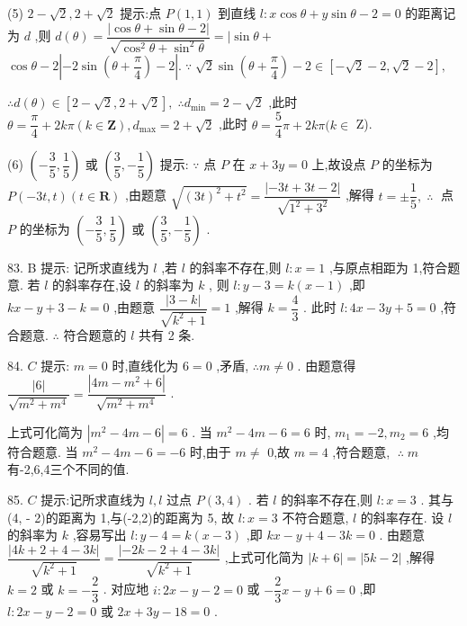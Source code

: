 (5) $2 - \sqrt{2},2 + \sqrt{2}$ 提示:点 $P\left( {1,1}\right)$ 到直线 $l : x\cos \theta  + y\sin \theta  - 2 = 0$ 的距离记为 $d$ ,则 $d\left( \theta \right)  = \dfrac{\left| \cos \theta  + \sin \theta  - 2\right| }{\sqrt{{\cos }^{2}\theta  + {\sin }^{2}\theta }} =  \mid  \sin \theta  +$  $\cos \theta  - 2\left| {-2\sin \left( {\theta  + \dfrac{\pi }{4}}\right)  - 2}\right| .\;\because \;\sqrt{2}\sin \left( {\theta  + \dfrac{\pi }{4}}\right)  - 2 \in  \left\lbrack  {-\sqrt{2} - 2,\sqrt{2} - 2}\right\rbrack  ,$

$\therefore d\left( \theta \right)  \in  \left\lbrack  {2 - \sqrt{2},2 + \sqrt{2}}\right\rbrack  ,\;\therefore {d}_{\min } = 2 - \sqrt{2}$ ,此时 $\theta  = \dfrac{\pi }{4} + {2k\pi }\left( {k \in  \mathbf{Z}}\right) ,{d}_{\max } = 2 + \sqrt{2}$ ,此时 $\theta  = \dfrac{5}{4}\pi  + {2k\pi }(k \in$ Z).

(6) $\left( {-\dfrac{3}{5},\dfrac{1}{5}}\right)$ 或 $\left( {\dfrac{3}{5}, - \dfrac{1}{5}}\right)$ 提示: $\because$ 点 $P$ 在 $x + {3y} = 0$ 上,故设点 $P$ 的坐标为 $P\left( {-{3t},t}\right) \left( {t \in  \mathbf{R}}\right)$ ,由题意 $\sqrt{{\left( 3t\right) }^{2} + {t}^{2}} = \dfrac{\left| -3t + 3t - 2\right| }{\sqrt{{1}^{2} + {3}^{2}}}$ ,解得 $t =  \pm  \dfrac{1}{5},\;\therefore \;$ 点 $P$ 的坐标为 $\left( {-\dfrac{3}{5},\dfrac{1}{5}}\right)$ 或 $\left( {\dfrac{3}{5}, - \dfrac{1}{5}}\right)$ .

83. B 提示: 记所求直线为 $l$ ,若 $l$ 的斜率不存在,则 $l : x = 1$ ,与原点相距为 1,符合题意. 若 $l$ 的斜率存在,设 $l$ 的斜率为 $k$ , 则 $l : y - 3 = k\left( {x - 1}\right)$ ,即 ${kx} - y + 3 - k = 0$ ,由题意 $\dfrac{\left| 3 - k\right| }{\sqrt{{k}^{2} + 1}} = 1$ ,解得 $k = \dfrac{4}{3}$ . 此时 $l : {4x} - {3y} + 5 = 0$ ,符合题意. $\therefore$ 符合题意的 $l$ 共有 2 条.

84. $C$ 提示: $m = 0$ 时,直线化为 $6 = 0$ ,矛盾, $\therefore m \neq  0$ . 由题意得 $\dfrac{\left| 6\right| }{\sqrt{{m}^{2} + {m}^{4}}} = \dfrac{\left| 4m - {m}^{2} + 6\right| }{\sqrt{{m}^{2} + {m}^{4}}}$ .

上式可化简为 $\left| {{m}^{2} - {4m} - 6}\right|  = 6$ . 当 ${m}^{2} - {4m} - 6 = 6$ 时, ${m}_{1} =  - 2,{m}_{2} = 6$ ,均符合题意. 当 ${m}^{2} - {4m} - 6 =  - 6$ 时,由于 $m \neq$ 0,故 $m = 4$ ,符合题意, $\;\therefore \;m$ 有-2,6,4三个不同的值.

85. $C$ 提示:记所求直线为 $l,l$ 过点 $P\left( {3,4}\right)$ . 若 $l$ 的斜率不存在,则 $l : x = 3$ . 其与(4, - 2)的距离为 1,与(-2,2)的距离为 5, 故 $l : x = 3$ 不符合题意, $l$ 的斜率存在. 设 $l$ 的斜率为 $k$ ,容易写出 $l : y - 4 = k\left( {x - 3}\right)$ ,即 ${kx} - y + 4 - {3k} = 0$ . 由题意 $\dfrac{\left| 4k + 2 + 4 - 3k\right| }{\sqrt{{k}^{2} + 1}} = \dfrac{\left| -2k - 2 + 4 - 3k\right| }{\sqrt{{k}^{2} + 1}}$ ,上式可化简为 $\left| {k + 6}\right|  = \left| {{5k} - 2}\right|$ ,解得 $k = 2$ 或 $k =  - \dfrac{2}{3}$ . 对应地 $i : {2x} - y - 2 = 0$ 或 $- \dfrac{2}{3}x - y + 6 = 0$ ,即 $l : {2x} - y - 2 = 0$ 或 ${2x} + {3y} - {18} = 0$ .

